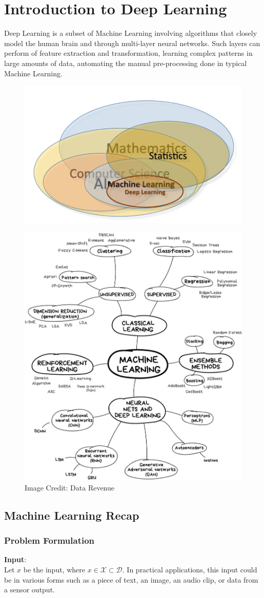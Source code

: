 \chapter{Introduction to Deep Learning}

Deep Learning is a subset of Machine Learning involving algorithms that closely model the human brain and through multi-layer neural networks. Such layers can perform of feature extraction and transformation, learning complex patterns in large amounts of data, automating the manual pre-processing done in typical Machine Learning.
\begin{figure}[H]
    \centering
    \includegraphics[width=0.3\linewidth]{img/overlap.png}
\end{figure}

\begin{figure}[H]
    \centering
    \includegraphics[width=0.55\linewidth]{img/ml_flowchart.png}
    \caption{Image Credit: Data Revenue}
    
\end{figure}

\section{Machine Learning Recap}
\subsection{Problem Formulation}
\textbf{Input}: \\
Let $x$ be the input, where $x\in\mathcal{X}\subset\mathcal{D}$. In practical applications, this input could be in various forms such as a piece of text, an image, an audio clip, or data from a sensor output.\\

